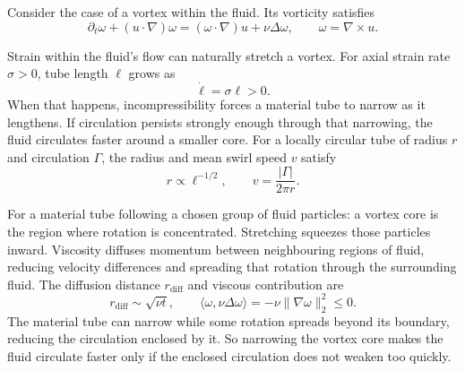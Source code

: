 Consider the case of a vortex within the fluid. Its vorticity satisfies
\[
 \partial_t\omega+(u\cdot\nabla)\omega
 =(\omega\cdot\nabla)u+\nu\Delta\omega,
 \qquad \omega=\nabla\times u.
\]

Strain within the fluid's flow can naturally stretch a vortex. For axial
strain rate \(\sigma>0\), tube length \(\ell\) grows as
\[
 \dot\ell=\sigma\ell>0.
\]
When that happens, incompressibility forces a material tube to narrow as it lengthens.
If circulation persists strongly enough through that narrowing, the fluid
circulates faster around a smaller core.
For a locally circular tube of radius \(r\) and circulation \(\Gamma\),
the radius and mean swirl speed \(v\) satisfy
\[
 r\propto\ell^{-1/2},
 \qquad v=\frac{|\Gamma|}{2\pi r}.
\]

For a material tube following a chosen group of fluid particles: a vortex
core is the region where rotation is concentrated. Stretching squeezes
those particles inward. Viscosity diffuses momentum between neighbouring
regions of fluid, reducing velocity differences and spreading that rotation
through the surrounding fluid.
The diffusion distance \(r_{\mathrm{diff}}\) and viscous contribution are
\[
 r_{\mathrm{diff}}\sim\sqrt{\nu t},
 \qquad
 \langle\omega,\nu\Delta\omega\rangle
 =-\nu\|\nabla\omega\|_2^2\le0.
\]
The material tube can narrow while some rotation spreads beyond its
boundary, reducing the circulation enclosed by it. So narrowing the vortex
core makes the fluid circulate faster only if the enclosed circulation does
not weaken too quickly.

